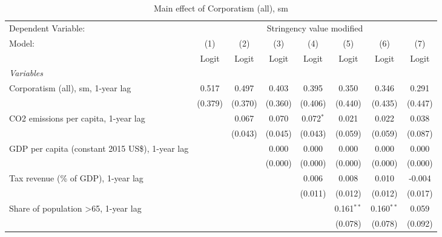 
\begin{table}[htbp]
   \caption{Main effect of Corporatism (all), sm}
   \centering
   \begin{tabular}{lccccccc}
      \toprule
      Dependent Variable: & \multicolumn{7}{c}{Stringency value modified}\\
      Model:                                                & (1)     & (2)     & (3)     & (4)         & (5)          & (6)          & (7)\\  
                                                            &  Logit  & Logit   & Logit   & Logit       & Logit        & Logit        & Logit\\  
      \midrule
      \emph{Variables}\\
      Corporatism (all), sm, 1-year lag                     & 0.517   & 0.497   & 0.403   & 0.395       & 0.350        & 0.346        & 0.291\\   
                                                            & (0.379) & (0.370) & (0.360) & (0.406)     & (0.440)      & (0.435)      & (0.447)\\   
      CO2 emissions per capita, 1-year lag                  &         & 0.067   & 0.070   & 0.072$^{*}$ & 0.021        & 0.022        & 0.038\\   
                                                            &         & (0.043) & (0.045) & (0.043)     & (0.059)      & (0.059)      & (0.087)\\   
      GDP per capita (constant 2015 US\$), 1-year lag       &         &         & 0.000   & 0.000       & 0.000        & 0.000        & 0.000\\   
                                                            &         &         & (0.000) & (0.000)     & (0.000)      & (0.000)      & (0.000)\\   
      Tax revenue (\% of GDP), 1-year lag                   &         &         &         & 0.006       & 0.008        & 0.010        & -0.004\\   
                                                            &         &         &         & (0.011)     & (0.012)      & (0.012)      & (0.017)\\   
      Share of population >65, 1-year lag                   &         &         &         &             & 0.161$^{**}$ & 0.160$^{**}$ & 0.059\\   
                                                            &         &         &         &             & (0.078)      & (0.078)      & (0.092)\\   

\end{tabular}
\end{table}
